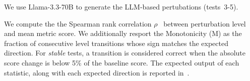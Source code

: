 We use Llama-3.3-70B to generate the LLM-based pertubations (tests~3-5). %

We compute the the Spearman rank correlation $\rho$~\cite{spearman1904proof} between perturbation level and mean metric score. We additionally resport the Monotonicity (M) as the fraction of consecutive level transitions whose sign matches the expected direction. For \emph{stable} tests, a transition is considered correct when the absolute score change is below 5\% of the baseline score.
The expected output of each statistic, along with each expected direction is reported in~.

